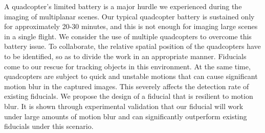 A quadcopter's limited battery is a major hurdle we experienced during
the imaging of multiplanar scenes. Our typical quadcopter battery is
sustained only for approximately 20-30 minutes, and this is not enough
for imaging large scenes in a single flight. We consider the use of
multiple quadcopters %
to overcome this battery issue. To collaborate, the relative spatial
position of the quadcopters have to be identified, so as to divide the
work in an appropriate manner. Fiducials come to our rescue for
tracking objects in this environment.
At the same time, quadcopters are subject to quick and unstable motions that can cause
significant motion blur in the captured images. This severely affects the
detection rate of existing fiducials.  We propose the design of a fiducial that is resilient to motion blur. 
It is shown through experimental
validation that our fiducial will work under large amounts of motion blur and
can significantly outperform existing fiducials under this scenario. 

